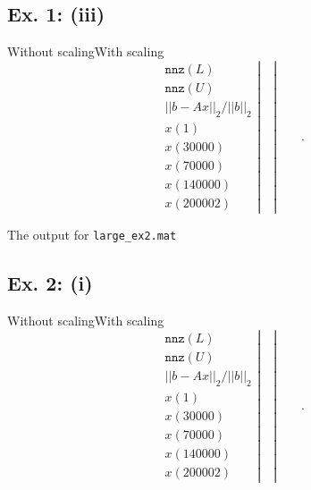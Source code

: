 \documentclass[11pt]{article}
\theoremstyle{definition}
\theoremstyle{remark}
\newcommand{\newpart}{\vspace{-0.5\baselineskip}\hrulefill\vspace{-1.3\baselineskip}}
\theoremstyle{plain}
\begin{document}
\newpart
\subsection*{Ex. 1: (iii)}
\hspace{6cm}Without scaling\hspace{3.25cm}With scaling
\begin{equation*}
    \left.\begin{array}{c}
      \texttt{nnz}(L)\\
      \texttt{nnz}(U)\\
      ||b-Ax||_2/||b||_2\\
      x(1)\\
      x(30000)\\
      x(70000)\\
      x(140000)\\
      x(200002)
    \end{array}\right|\quad
    \left.\right|\qquad
    .
\end{equation*}\newpage

The output for \texttt{large\_ex2.mat}

\newpart
\subsection*{Ex. 2: (i)}
\hspace{6cm}Without scaling\hspace{3.25cm}With scaling
\begin{equation*}
    \left.\begin{array}{c}
      \texttt{nnz}(L)\\
      \texttt{nnz}(U)\\
      ||b-Ax||_2/||b||_2\\
      x(1)\\
      x(30000)\\
      x(70000)\\
      x(140000)\\
      x(200002)
    \end{array}\right|\quad
    \left.\right|\qquad
    .
\end{equation*}
\end{document}
